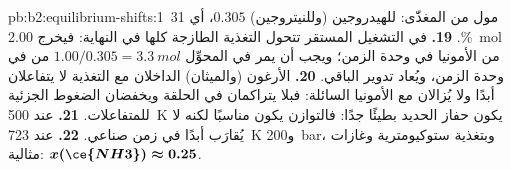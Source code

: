 \begin{solution}{pb:b2:equilibrium-shifts:1}
مول من  المغذّى:  للهيدروجين (وللنيتروجين)
$0.305$، أي 31\,\%.
\textbf{19.} في التشغيل المستقر تتحول التغذية الطازجة كلها في النهاية:
فيخرج \qty{2.00}{mol} من الأمونيا في وحدة الزمن؛ ويجب أن يمر في المحوِّل $1.00/
0.305 = \qty{3.3}{mol}$ من  في وحدة الزمن، ويُعاد تدوير الباقي.
\textbf{20.} الأرغون (والميثان) الداخلان مع التغذية لا يتفاعلان أبدًا ولا
يُزالان مع الأمونيا السائلة: فبلا  يتراكمان في الحلقة
ويخفضان الضغوط الجزئية للمتفاعلات.
\textbf{21.} عند \qty{500}{K} يكون حفاز الحديد بطيئًا جدًا: فالتوازن
يكون مناسبًا لكنه لا يُقارَب أبدًا في زمن صناعي.
\textbf{22.} عند \qty{723}{K} و\qty{200}{bar}، وبتغذية ستوكيومترية وغازات
مثالية: $\boldsymbol{x(\ce{NH3}) \approx 0.25}$.
\end{solution}
